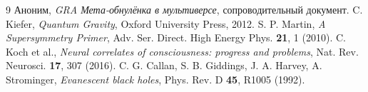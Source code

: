 \documentclass[11pt,a4paper]{article}
\begin{document}
\begin{thebibliography}{9}
 Аноним, \textit{GRA Мета-обнулёнка в мультиверсе}, сопроводительный документ.
 C. Kiefer, \textit{Quantum Gravity}, Oxford University Press, 2012.
 S. P. Martin, \textit{A Supersymmetry Primer}, Adv. Ser. Direct. High Energy Phys. \textbf{21}, 1 (2010).
 C. Koch et al., \textit{Neural correlates of consciousness: progress and problems}, Nat. Rev. Neurosci. \textbf{17}, 307 (2016).
 C. G. Callan, S. B. Giddings, J. A. Harvey, A. Strominger, \textit{Evanescent black holes}, Phys. Rev. D \textbf{45}, R1005 (1992).
\end{thebibliography}
\end{document}
